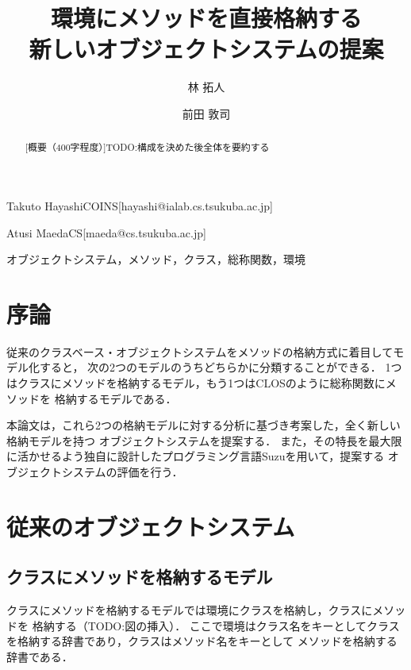 \documentclass{ipsjprosym}
\begin{document}
\title{環境にメソッドを直接格納する \\ 新しいオブジェクトシステムの提案}


\author{林 拓人}{Takuto Hayashi}{COINS}[hayashi@ialab.cs.tsukuba.ac.jp]
\author{前田 敦司}{Atusi Maeda}{CS}[maeda@cs.tsukuba.ac.jp]

\begin{abstract}
[概要（400字程度）]TODO:構成を決めた後全体を要約する
\end{abstract}

\begin{jkeyword}
オブジェクトシステム，メソッド，クラス，総称関数，環境
\end{jkeyword}

\maketitle

\section{序論}

従来のクラスベース・オブジェクトシステムをメソッドの格納方式に着目してモデル化すると，
次の2つのモデルのうちどちらかに分類することができる．
1つはクラスにメソッドを格納するモデル，もう1つはCLOS\cite{CLOS}のように総称関数にメソッドを
格納するモデルである．

本論文は，これら2つの格納モデルに対する分析に基づき考案した，全く新しい格納モデルを持つ
オブジェクトシステムを提案する．
また，その特長を最大限に活かせるよう独自に設計したプログラミング言語Suzuを用いて，提案する
オブジェクトシステムの評価を行う．

\section{従来のオブジェクトシステム}

\subsection{クラスにメソッドを格納するモデル}

クラスにメソッドを格納するモデルでは環境にクラスを格納し，クラスにメソッドを
格納する（TODO:図の挿入）．
ここで環境はクラス名をキーとしてクラスを格納する辞書であり，クラスはメソッド名をキーとして
メソッドを格納する辞書である．
\end{document}
